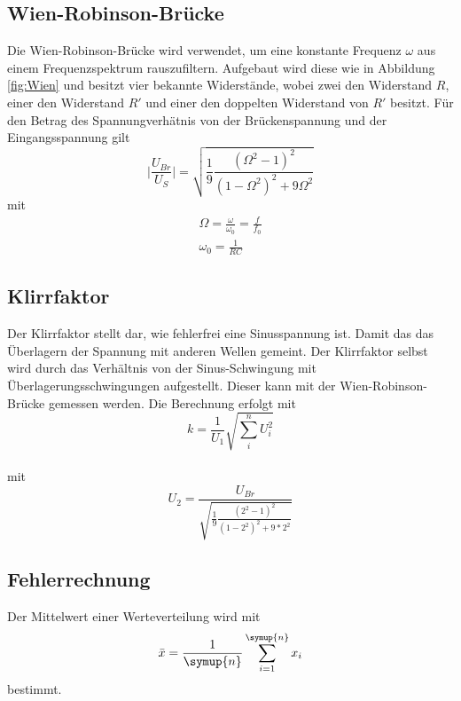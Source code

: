     \subsection{Wien-Robinson-Brücke}
    Die Wien-Robinson-Brücke wird verwendet, um eine konstante Frequenz $\omega$ aus einem Frequenzspektrum rauszufiltern.
    Aufgebaut wird diese wie in Abbildung \ref{fig:Wien} und besitzt vier bekannte Widerstände, wobei zwei den Widerstand $R$, einer den Widerstand $R'$ und einer den doppelten Widerstand von $R'$ besitzt.
    Für den Betrag des Spannungverhätnis von der Brückenspannung und der Eingangsspannung gilt 
    \begin{equation}
       \biggl|\frac{U_{Br}}{U_S}\biggr|=\sqrt{\frac{1}{9}\frac{(\Omega^2-1)^2}{(1-\Omega^2)^2+9\Omega^2}}
       \label{eqn:filter}
    \end{equation}
    mit 
    \begin{gather}
        \Omega=\frac{\omega}{\omega_0}=\frac{f}{f_0}
        \label{eqn:Omega}
        \\
        \omega_0=\frac{1}{RC}
        \label{eqn:omega}
    \end{gather}

    \subsection{Klirrfaktor}
    Der Klirrfaktor stellt dar, wie fehlerfrei eine Sinusspannung ist. 
    Damit das das Überlagern der Spannung mit anderen Wellen gemeint.
    Der Klirrfaktor selbst wird durch das Verhältnis von der Sinus-Schwingung mit Überlagerungsschwingungen aufgestellt.
    Dieser kann mit der Wien-Robinson-Brücke gemessen werden.       
    Die Berechnung erfolgt mit 
    \begin{equation}
        k=\frac{1}{U_1}\sqrt{\sum_{i}^{n}{U_i^2}}
        \label{eqn:klirr1}
    \end{equation}\\
    mit
    \begin{equation}
        U_2=\frac{U_{Br}}{\sqrt{\frac{1}{9} \frac{(2^2-1)^2}{(1-2^2)^2+9*2^2}}}
        \label{eqn:oberwelle} 
    \end{equation}

\subsection{Fehlerrechnung}
Der Mittelwert einer Werteverteilung wird mit
\begin{equation}
    \bar{x}=\frac{1}{\symup{n}}\sum_{i=1}^{\symup{n}} x_i
    \label{eqn:MW}
\end{equation} 
bestimmt.

